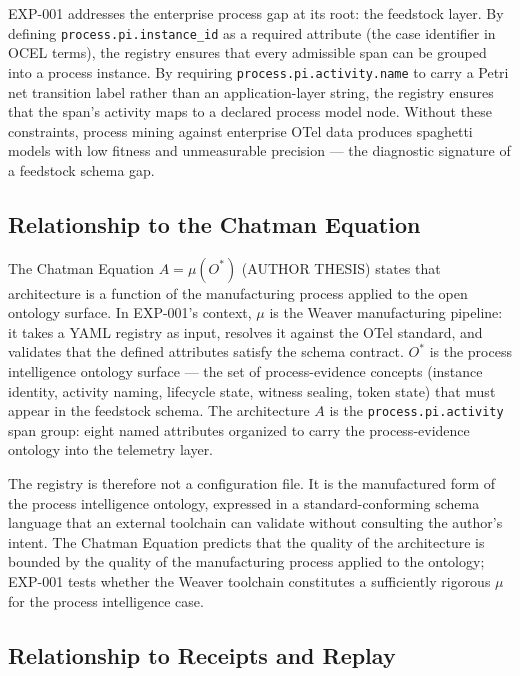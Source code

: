 EXP-001 addresses the enterprise process gap at its root: the feedstock layer. By defining
\texttt{process.pi.instance\_id} as a required attribute (the case identifier in OCEL terms),
the registry ensures that every admissible span can be grouped into a process instance. By requiring
\texttt{process.pi.activity.name} to carry a Petri net transition label rather than an
application-layer string, the registry ensures that the span's activity maps to a declared process
model node. Without these constraints, process mining against enterprise OTel data produces
spaghetti models with low fitness and unmeasurable precision --- the diagnostic signature of
a feedstock schema gap.

\subsection{Relationship to the Chatman Equation}
\label{sec:otel-weaver-exp-001-custom-pi-registry-lineage-chatman-equation}

The Chatman Equation \(A = \mu(O^{*})\) (AUTHOR THESIS) states that architecture is a function
of the manufacturing process applied to the open ontology surface. In EXP-001's context,
\(\mu\) is the Weaver manufacturing pipeline: it takes a YAML registry as input, resolves it
against the OTel standard, and validates that the defined attributes satisfy the schema contract.
\(O^{*}\) is the process intelligence ontology surface --- the set of process-evidence concepts
(instance identity, activity naming, lifecycle state, witness sealing, token state) that must
appear in the feedstock schema. The architecture \(A\) is the \texttt{process.pi.activity} span
group: eight named attributes organized to carry the process-evidence ontology into the telemetry
layer.

The registry is therefore not a configuration file. It is the manufactured form of the process
intelligence ontology, expressed in a standard-conforming schema language that an external
toolchain can validate without consulting the author's intent. The Chatman Equation predicts that
the quality of the architecture is bounded by the quality of the manufacturing process applied to
the ontology; EXP-001 tests whether the Weaver toolchain constitutes a sufficiently rigorous
\(\mu\) for the process intelligence case.

\subsection{Relationship to Receipts and Replay}
\label{sec:otel-weaver-exp-001-custom-pi-registry-lineage-receipts}

